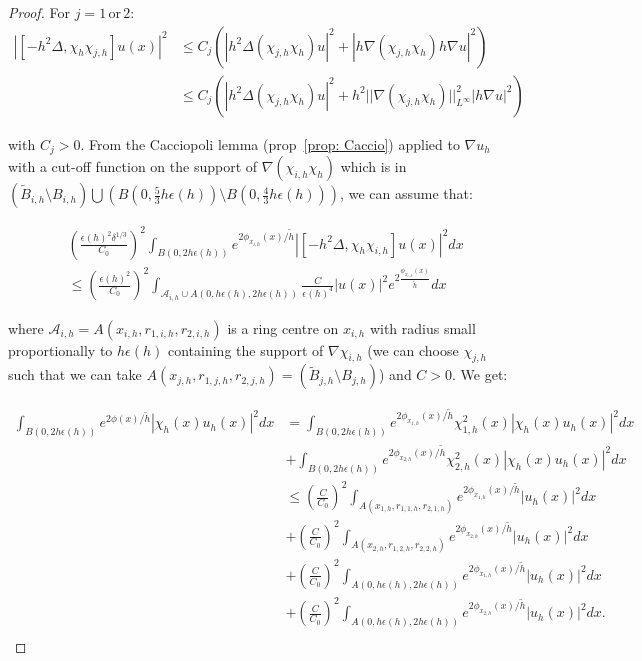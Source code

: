 \documentclass[leqno,11pt,letterpaper, english]{amsart}
\newcommand{\nn}{\nonumber}
\theoremstyle{plain}
\theoremstyle{definition}
\numberwithin{equation}{section}
\begin{document}
\begin{proof}
	For $j=1\, \mbox{or}\, 2$:
	\begin{align}
		|[-h^2\Delta, \chi_{h}\chi_{j,h}]u(x)|^2 &\leq C_j (|h^2\Delta(\chi_{j,h}\chi_{h})u|^2 +|h\nabla (\chi_{j,h}\chi_{h})h\nabla u|^2)\nn\\
		&\leq C_j(|h^2\Delta(\chi_{j,h}\chi_{h})u|^2 +h^2||\nabla (\chi_{j,h}\chi_{h})||_{L^\infty}^2|h\nabla u|^2)
	\end{align}
	
	with $C_j>0$.
	From the Cacciopoli lemma (prop~\ref{prop: Caccio}) applied to $\nabla u_h$ with a cut-off function on the support of $\nabla (\chi_{i,h}\chi_{h})$ which is in $(\tilde{B}_{i,h}\setminus B_{i,h})\bigcup (B(0,\frac{5}{3}h\epsilon(h))\setminus B(0,\frac{4}{3}h\epsilon(h)))$,  we can assume that:
	
	\begin{align}
		&\left(\frac{\epsilon(h)^2\delta^{1/3}}{C_0}\right)^2  \int_{B(0,2h\epsilon(h))} e^{2\phi_{x_{i,h}}(x)/\tilde{h}}  |[-h^2\Delta, \chi_{h}\chi_{i,h}]u(x)|^2  dx  \nn\\
		&\leq\left(\frac{\epsilon(h)^2}{C_0}\right)^2\int_{\mathcal{A}_{i,h}\cup A(0,h\epsilon(h),2h\epsilon(h))} \frac{C}{\epsilon(h)^4}| u(x)|^2e^{2\frac{\phi_{x_{i,h}}(x)}{\tilde{h}}} dx   
	\end{align}
	
	where $\mathcal{A}_{i,h}=A(x_{i,h},r_{1,i,h},r_{2,i,h})$ is a ring centre on $x_{i,h}$ with radius small proportionally to $h\epsilon(h)$ containing the support of $\nabla\chi_{i,h}$ (we can choose $\chi_{j,h}$ such that we can take $A(x_{j,h},r_{1,j,h},r_{2,j,h})=(\tilde{B}_{j,h}\setminus B_{j,h})$) and $C >0$. We get:
	
	\begin{align}
		\int_{B(0,2h\epsilon(h))} e^{2\phi(x)/\tilde{h}} |\chi_{h}(x) u_h(x)|^2 dx &= \int_{B(0,2h\epsilon(h))} e^{2\phi_{x_{1,h}}(x)/\tilde{h}} \chi_{1,h}^2(x) |\chi_{h}(x) u_h(x)|^2 dx \nn\\
		&+\int_{B(0,2h\epsilon(h))} e^{2\phi_{x_{2,h}}(x)/\tilde{h}} \chi_{2,h}^2(x) |\chi_{h}(x) u_h(x)|^2 dx\nn\\
		&\leq  \left(\frac{C}{C_0}\right)^2\int_{A(x_{1,h},r_{1,1,h},r_{2,1,h})} e^{2\phi_{x_{1,h}}(x)/\tilde{h}}  |u_h(x)|^2 dx   \nn\\
		&+   \left(\frac{C}{C_0}\right)^2\int_{A(x_{2,h},r_{1,2,h},r_{2,2,h})} e^{2\phi_{x_{2,h}}(x)/\tilde{h}}  |u_h(x)|^2  dx   \nn\\
		&+ \left(\frac{C}{C_0}\right)^2\int_{ A(0,h\epsilon(h),2h\epsilon(h))} e^{2\phi_{x_{1,h}}(x)/\tilde{h}}  |u_h(x)|^2 dx   \nn\\
		&+   \left(\frac{C}{C_0}\right)^2\int_{ A(0,h\epsilon(h),2h\epsilon(h))} e^{2\phi_{x_{2,h}}(x)/\tilde{h}}  |u_h(x)|^2  dx.   \nn\\
	\end{align}
	

\end{proof}
\end{document}
